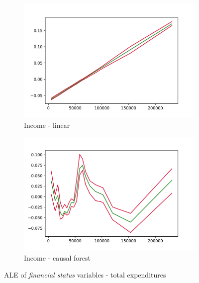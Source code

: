 \begin{figure}[h]
    \begin{subfigure}{0.5\linewidth}
        \includegraphics[width=\linewidth]{figures/ALE/chFDexp/spec3_linear_FINCBTXM.png}
        \caption{Income - linear}
    \end{subfigure}%
    \begin{subfigure}{0.5\linewidth}
        \includegraphics[width=\linewidth]{figures/ALE/chFDexp/spec3_cf_FINCBTXM.png}
        \caption{Income - causal forest}
    \end{subfigure}
    \caption{ALE of \textit{financial status} variables - total expenditures}
    \label{app:ale_finstat_fd}
\end{figure}